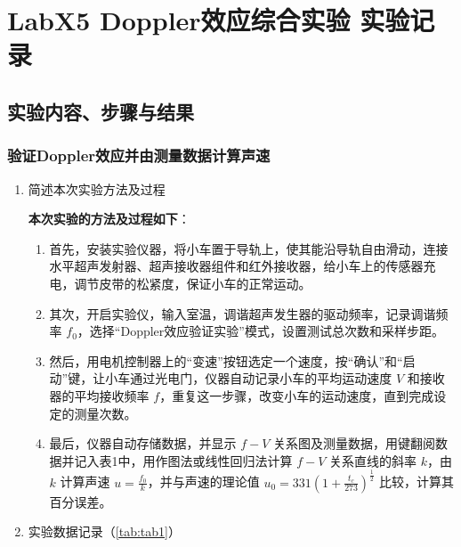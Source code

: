 \documentclass[dvipsnames, svgnames,a4paper,11pt]{article}
\begin{document}
	\section{LabX5 Doppler效应综合实验 \quad\heiti 实验记录}
	\subsection{实验内容、步骤与结果}
	\subsubsection{验证Doppler效应并由测量数据计算声速}
	\begin{enumerate}
		\item 简述本次实验方法及过程
		
		\textbf{本次实验的方法及过程如下}：
		
		\begin{enumerate}
			\item 首先，安装实验仪器，将小车置于导轨上，使其能沿导轨自由滑动，连接水平超声发射器、超声接收器组件和红外接收器，给小车上的传感器充电，调节皮带的松紧度，保证小车的正常运动。
			
			\item 其次，开启实验仪，输入室温，调谐超声发生器的驱动频率，记录调谐频率 \( f_0 \)，选择“Doppler效应验证实验”模式，设置测试总次数和采样步距。
			
			\item 然后，用电机控制器上的“变速”按钮选定一个速度，按“确认”和“启动”键，让小车通过光电门，仪器自动记录小车的平均运动速度 \( V \) 和接收器的平均接收频率 \( f \)，重复这一步骤，改变小车的运动速度，直到完成设定的测量次数。
			
			\item 最后，仪器自动存储数据，并显示 \( f-V \) 关系图及测量数据，用键翻阅数据并记入表1中，用作图法或线性回归法计算 \( f-V \) 关系直线的斜率 \( k \)，由 \( k \) 计算声速 \( u = \frac{f_0}{k} \)，并与声速的理论值 \( u_0 = 331(1+\frac{t_c}{273})^{\frac{1}{2}} \) 比较，计算其百分误差。
		\end{enumerate}				
		
		\clearpage
		\item 实验数据记录（\cref{tab:tab1}）
		

\end{enumerate}
\end{document}
